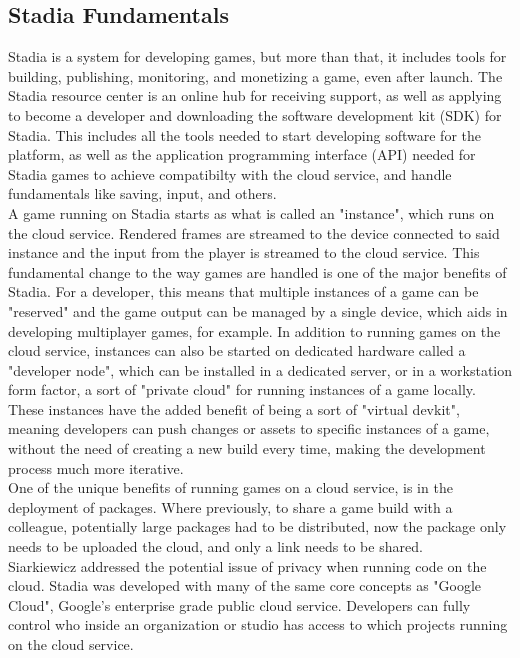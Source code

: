 \documentclass[a4paper]{article}
\begin{document}
\subsection{Stadia Fundamentals}
Stadia is a system for developing games, but more than that, it includes tools for building, publishing, monitoring, and monetizing a game, even after launch. The Stadia resource center is an online hub for receiving support, as well as applying to become a developer and downloading the software development kit (SDK) for Stadia. This includes all the tools needed to start developing software for the platform, as well as the application programming interface (API) needed for Stadia games to achieve compatibilty with the cloud service, and handle fundamentals like saving, input, and others.\\
A game running on Stadia starts as what is called an "instance", which runs on the cloud service. Rendered frames are streamed to the device connected to said instance and the input from the player is streamed to the cloud service. This fundamental change to the way games are handled is one of the major benefits of Stadia. For a developer, this means that multiple instances of a game can be "reserved" and the game output can be managed by a single device, which aids in developing multiplayer games, for example. In addition to running games on the cloud service, instances can also be started on dedicated hardware called a "developer node", which can be installed in a dedicated server, or in a workstation form factor, a sort of "private cloud" for running instances of a game locally. These instances have the added benefit of being a sort of "virtual devkit", meaning developers can push changes or assets to specific instances of a game, without the need of creating a new build every time, making the development process much more iterative.\\One of the unique benefits of running games on a cloud service, is in the deployment of packages. Where previously, to share a game build with a colleague, potentially large packages had to be distributed, now the package only needs to be uploaded the cloud, and only a link needs to be shared. \\
Siarkiewicz addressed the potential issue of privacy when running code on the cloud. Stadia was developed with many of the same core concepts as "Google Cloud", Google's enterprise grade public cloud service. Developers can fully control who inside an organization or studio has access to which projects running on the cloud service.
\end{document}
